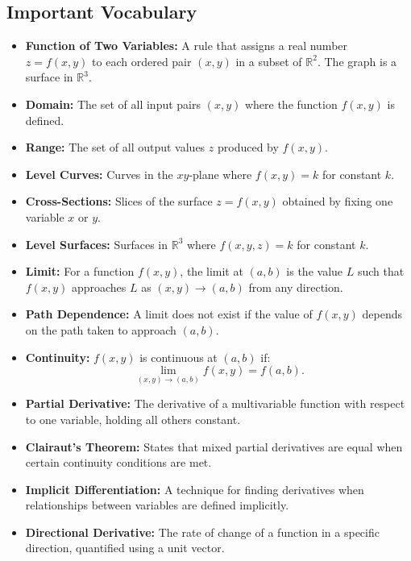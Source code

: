 \newpage

\formsdefs{}

\subsection*{Important Vocabulary}
\begin{itemize}
    \item \textbf{Function of Two Variables:} A rule that assigns a real number \( z = f(x, y) \) to each ordered pair \( (x, y) \) in a subset of \( \mathbb{R}^2 \). The graph is a surface in \( \mathbb{R}^3 \).
    \item \textbf{Domain:} The set of all input pairs \( (x, y) \) where the function \( f(x, y) \) is defined.
    \item \textbf{Range:} The set of all output values \( z \) produced by \( f(x, y) \).
    \item \textbf{Level Curves:} Curves in the \( xy \)-plane where \( f(x, y) = k \) for constant \( k \).
    \item \textbf{Cross-Sections:} Slices of the surface \( z = f(x, y) \) obtained by fixing one variable \( x \) or \( y \).
    \item \textbf{Level Surfaces:} Surfaces in \( \mathbb{R}^3 \) where \( f(x, y, z) = k \) for constant \( k \).
    \item \textbf{Limit:} For a function \( f(x, y) \), the limit at \( (a, b) \) is the value \( L \) such that \( f(x, y) \) approaches \( L \) as \( (x, y) \to (a, b) \) from any direction.
    \item \textbf{Path Dependence:} A limit does not exist if the value of \( f(x, y) \) depends on the path taken to approach \( (a, b) \).
    \item \textbf{Continuity:} \( f(x, y) \) is continuous at \( (a, b) \) if:
    \[
    \lim_{(x, y) \to (a, b)} f(x, y) = f(a, b).
    \]
    \item \textbf{Partial Derivative:} The derivative of a multivariable function with respect to one variable, holding all others constant.
    \item \textbf{Clairaut's Theorem:} States that mixed partial derivatives are equal when certain continuity conditions are met.
    \item \textbf{Implicit Differentiation:} A technique for finding derivatives when relationships between variables are defined implicitly.
    \item \textbf{Directional Derivative:} The rate of change of a function in a specific direction, quantified using a unit vector.

\end{itemize}
